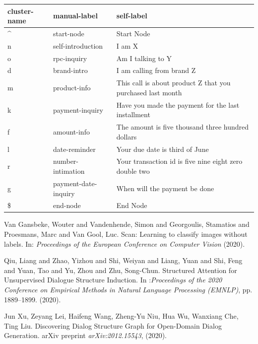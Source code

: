\documentclass{article}
\begin{document}
\begin{tabular}{ l | l | l}
  \hline
  cluster-name & manual-label & self-label \\
  \hline
  \textasciicircum & start-node & Start Node \\
  n & self-introduction & I am X  \\
  o & rpc-inquiry & Am I talking to Y  \\
  d & brand-intro & I am calling from brand Z \\
  m & product-info & This call is about product Z that you purchased last month \\
  k & payment-inquiry & Have you made the payment for the last installment \\
  f & amount-info & The amount is five thousand three hundred dollars \\
  l & date-reminder & Your due date is third of June \\
  r & number-intimation & Your transaction id is five nine eight zero double two   \\
  g & payment-date-inquiry & When will the payment be done   \\
  \$ & end-node & End Node
\end{tabular}






 
\begin{thebibliography}{1}
    \newblock Van Gansbeke, Wouter and Vandenhende, Simon and Georgoulis, Stamatios and Proesmans, Marc and Van Gool, Luc. Scan: Learning to classify images without labels. 
    \newblock In: {\em Proceedings of the European Conference on Computer Vision} (2020).
	


	\newblock Qiu, Liang  and Zhao, Yizhou  and Shi, Weiyan  and Liang, Yuan  and      Shi, Feng  and Yuan, Tao  and Yu, Zhou  and Zhu, Song-Chun. Structured Attention for Unsupervised Dialogue Structure Induction.
	\newblock In :{\em Proceedings of the 2020 Conference on Empirical Methods in Natural Language Processing (EMNLP)}, pp. 1889--1899.  (2020).

	\newblock Jun Xu, Zeyang Lei, Haifeng Wang, Zheng-Yu Niu, Hua Wu, Wanxiang Che, Ting Liu. Discovering Dialog Structure Graph for Open-Domain Dialog Generation.
	\newblock arXiv preprint {\em arXiv:2012.15543}, (2020).

\end{thebibliography}
\end{document}
